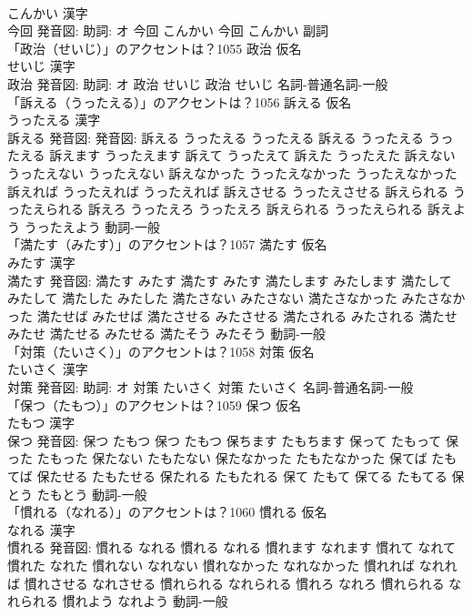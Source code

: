 \documentclass[8pt]{extreport}
\begin{document}
\begin{CJK}{UTF8}{min}
\\	こんかい 漢字　
\\	今回 発音図: 助詞: オ	今回 こんかい		今回 こんかい				副詞 
\\	「政治（せいじ）」のアクセントは？1055	政治 仮名　
\\	せいじ 漢字　
\\	政治 発音図: 助詞: オ	政治 せいじ		政治 せいじ				名詞-普通名詞-一般 
\\	「訴える（うったえる）」のアクセントは？1056	訴える 仮名　
\\	うったえる 漢字　
\\	訴える 発音図: 発音図:	訴える うったえる うったえる		訴える うったえる うったえる 訴えます うったえます 訴えて うったえて 訴えた うったえた 訴えない うったえない うったえない 訴えなかった うったえなかった うったえなかった 訴えれば うったえれば うったえれば 訴えさせる うったえさせる 訴えられる うったえられる 訴えろ うったえろ うったえろ 訴えられる うったえられる 訴えよう うったえよう				動詞-一般 
\\	「満たす（みたす）」のアクセントは？1057	満たす 仮名　
\\	みたす 漢字　
\\	満たす 発音図:	満たす みたす		満たす みたす 満たします みたします 満たして みたして 満たした みたした 満たさない みたさない 満たさなかった みたさなかった 満たせば みたせば 満たさせる みたさせる 満たされる みたされる 満たせ みたせ 満たせる みたせる 満たそう みたそう				動詞-一般 
\\	「対策（たいさく）」のアクセントは？1058	対策 仮名　
\\	たいさく 漢字　
\\	対策 発音図: 助詞: オ	対策 たいさく		対策 たいさく				名詞-普通名詞-一般 
\\	「保つ（たもつ）」のアクセントは？1059	保つ 仮名　
\\	たもつ 漢字　
\\	保つ 発音図:	保つ たもつ		保つ たもつ 保ちます たもちます 保って たもって 保った たもった 保たない たもたない 保たなかった たもたなかった 保てば たもてば 保たせる たもたせる 保たれる たもたれる 保て たもて 保てる たもてる 保とう たもとう				動詞-一般 
\\	「慣れる（なれる）」のアクセントは？1060	慣れる 仮名　
\\	なれる 漢字　
\\	慣れる 発音図:	慣れる なれる		慣れる なれる 慣れます なれます 慣れて なれて 慣れた なれた 慣れない なれない 慣れなかった なれなかった 慣れれば なれれば 慣れさせる なれさせる 慣れられる なれられる 慣れろ なれろ 慣れられる なれられる 慣れよう なれよう				動詞-一般 

\end{CJK}
\end{document}
